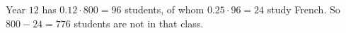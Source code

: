 Year $12$ has $0.12\cdot800=96$ students, of whom $0.25\cdot96=24$ study French. So $800-24=\boxed{776}$ students are not in that class.
